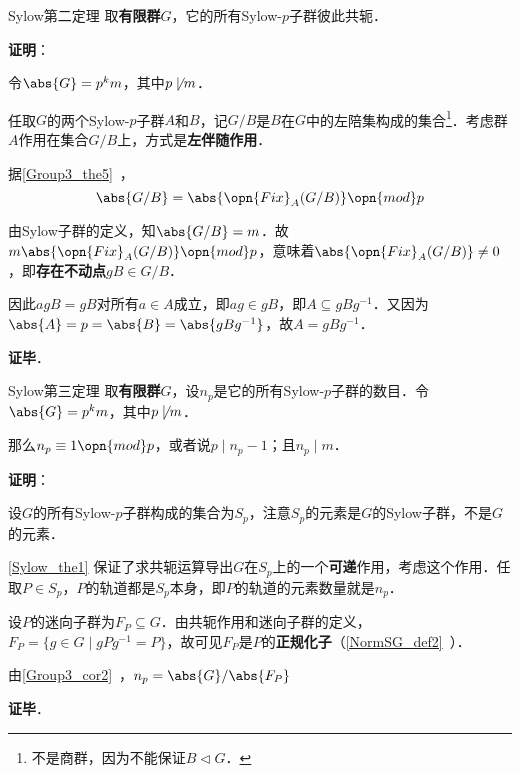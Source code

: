 \begin{theorem}{Sylow第二定理}\label{Sylow_the1}
取\textbf{有限群}$G$，它的所有Sylow-$p$子群彼此共轭．
\end{theorem}

\textbf{证明}：

令$\abs{G}=p^km$，其中$p\not\mid m$．

任取$G$的两个Sylow-$p$子群$A$和$B$，记$G/B$是$B$在$G$中的左陪集构成的集合\footnote{不是商群，因为不能保证$B\vartriangleleft G$．}．考虑群$A$作用在集合$G/B$上，方式是\textbf{左伴随作用}．

据\autoref{Group3_the5}~，
\begin{equation}
\abs{G/B} = \abs{\opn{Fix}_A(G/B)} \opn{mod} p
\end{equation}

由Sylow子群的定义，知$\abs{G/B}=m$．故$m\abs{\opn{Fix}_A(G/B)} \opn{mod} p$，意味着$\abs{\opn{Fix}_A(G/B)}\neq 0$，即\textbf{存在不动点}$gB\in G/B$．

因此$agB=gB$对所有$a\in A$成立，即$ag\in gB$，即$A\subseteq gBg^{-1}$．又因为$\abs{A}=p=\abs{B}=\abs{gBg^{-1}}$，故$A=gBg^{-1}$．


\textbf{证毕}．




\begin{theorem}{Sylow第三定理}
取\textbf{有限群}$G$，设$n_p$是它的所有Sylow-$p$子群的数目．令$\abs{G}=p^km$，其中$p\not\mid m$．

那么$n_p\equiv 1\opn{mod} p$，或者说$p\mid n_p-1$；且$n_p\mid m$．
\end{theorem}

\textbf{证明}：

设$G$的所有Sylow-$p$子群构成的集合为$S_p$，注意$S_p$的元素是$G$的Sylow子群，不是$G$的元素．

\autoref{Sylow_the1} 保证了求共轭运算导出$G$在$S_p$上的一个\textbf{可递}作用，考虑这个作用．任取$P\in S_p$，$P$的轨道都是$S_p$本身，即$P$的轨道的元素数量就是$n_p$．

设$P$的迷向子群为$F_P\subseteq G$．由共轭作用和迷向子群的定义，$F_P=\{g\in G\mid gPg^{-1}=P\}$，故可见$F_P$是$P$的\textbf{正规化子}（\autoref{NormSG_def2}~）．

由\autoref{Group3_cor2}~，$n_p=\abs{G}/\abs{F_P}$

\textbf{证毕}．




















